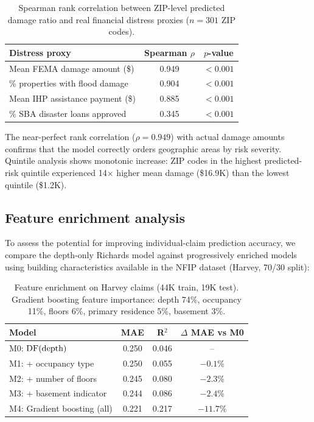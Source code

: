 \begin{table}[h!]
\centering
\begin{tabular}{|l|c|c|}
\hline
\textbf{Distress proxy} & \textbf{Spearman $\rho$} & \textbf{$p$-value} \\
\hline
Mean FEMA damage amount (\$) & 0.949 & $< 0.001$ \\
\% properties with flood damage & 0.904 & $< 0.001$ \\
Mean IHP assistance payment (\$) & 0.885 & $< 0.001$ \\
\% SBA disaster loans approved & 0.345 & $< 0.001$ \\
\hline
\end{tabular}
\caption{Spearman rank correlation between ZIP-level predicted damage ratio and real financial distress proxies ($n = 301$ ZIP codes).}
\label{tab: defaults correlation}
\end{table}

The near-perfect rank correlation ($\rho = 0.949$) with actual damage amounts confirms that the model correctly orders geographic areas by risk severity. Quintile analysis shows monotonic increase: ZIP codes in the highest predicted-risk quintile experienced 14$\times$ higher mean damage (\$16.9K) than the lowest quintile (\$1.2K).

\subsection{Feature enrichment analysis}
\label{ssec: feature enrichment}

To assess the potential for improving individual-claim prediction accuracy, we compare the depth-only Richards model against progressively enriched models using building characteristics available in the NFIP dataset (Harvey, 70/30 split):

\begin{table}[h!]
\centering
\begin{tabular}{|l|c|c|c|}
\hline
\textbf{Model} & \textbf{MAE} & \textbf{R$^2$} & \textbf{$\Delta$ MAE vs M0} \\
\hline
M0: $\text{DF}(\text{depth})$ & 0.250 & 0.046 &  --  \\
M1: + occupancy type & 0.250 & 0.055 & $-0.1$\% \\
M2: + number of floors & 0.245 & 0.080 & $-2.3$\% \\
M3: + basement indicator & 0.244 & 0.086 & $-2.4$\% \\
M4: Gradient boosting (all) & 0.221 & 0.217 & $-11.7$\% \\
\hline
\end{tabular}
\caption{Feature enrichment on Harvey claims (44K train, 19K test). Gradient boosting feature importance: depth 74\%, occupancy 11\%, floors 6\%, primary residence 5\%, basement 3\%.}
\label{tab: feature enrichment}
\end{table}

